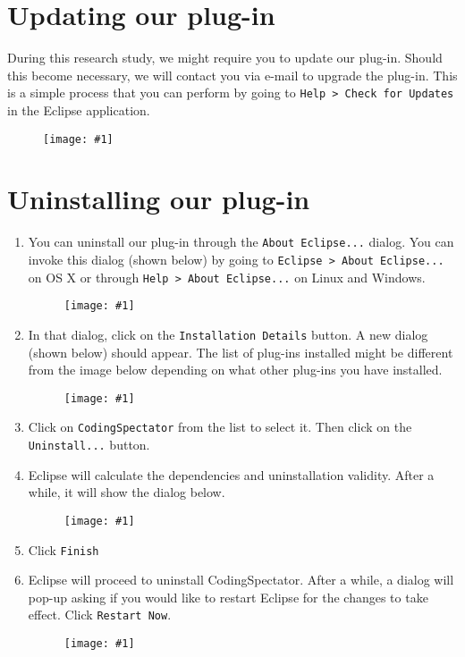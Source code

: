 \documentclass{article}
\newcommand\fig[1]{\texttt{[image: \#1]}}
\newcommand\codspec{CodingSpectator}
\newcommand\uiref[1]{\texttt{#1}}
\begin{document}
\section{Updating our plug-in}

During this research study, we might require you to update our plug-in. Should
this become necessary, we will contact you via e-mail to upgrade the plug-in.
This is a simple process that you can perform by going to \uiref{Help > Check
for Updates} in the Eclipse application.

\begin{figure}
%
\centering
%
\fig{figs/updates}
%
\end{figure}
%
\section{Uninstalling our plug-in}

\begin{enumerate}
%
\item You can uninstall our plug-in through the \uiref{About Eclipse...} dialog.
You can invoke this dialog (shown below) by going to \uiref{Eclipse > About
Eclipse...} on OS X or through \uiref{Help > About Eclipse...} on Linux and
Windows.

\begin{figure}
%
\centering
%
\fig{figs/uninstall_step1}
%
\end{figure}
%
\item In that dialog, click on the \uiref{Installation Details} button. A new
dialog (shown below) should appear. The list of plug-ins installed might be
different from the image below depending on what other plug-ins you have
installed.

\begin{figure}
%
\centering
%
\fig{figs/uninstall_step2}
%
\end{figure}
%
\item Click on \uiref{\codspec} from the list to select it. Then click on the
\uiref{Uninstall...} button.
%
\item Eclipse will calculate the dependencies and uninstallation validity. After
a while, it will show the dialog below.

\begin{figure}
%
\centering
%
\fig{figs/uninstall_step3}
%
\end{figure}
%
\item Click \uiref{Finish}
%
\item Eclipse will proceed to uninstall \codspec. After a while, a dialog will
pop-up asking if you would like to restart Eclipse for the changes to take
effect. Click \uiref{Restart Now}.

\begin{figure}
%
\centering
%
\fig{figs/uninstall_step4}
%
\end{figure}
%
\end{enumerate}
%
\end{document}
